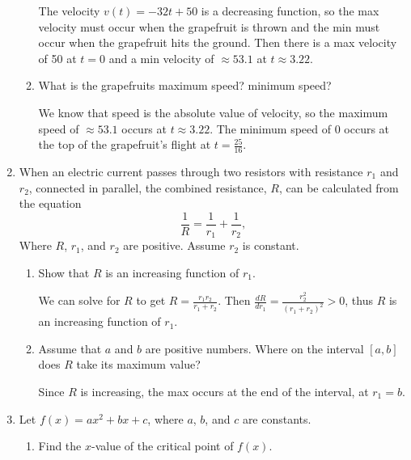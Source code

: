 \documentclass[11pt]{article}
\begin{document}
\begin{enumerate}
\begin{enumerate}
{      The velocity $v(t) = -32t+50$ is a decreasing function, so the
      max velocity must occur when the grapefruit is thrown and the
      min must occur when the grapefruit hits the ground. Then there
      is a max velocity of 50 at $t=0$ and a min velocity of $\approx
      53.1$ at $t\approx 3.22$.

    }
    \vfill
    
  \item What is the grapefruits maximum speed? minimum speed?
    \vfill
    {\color{blue}

      We know that speed is the absolute value of velocity, so the
      maximum speed of $\approx 53.1$ occurs at $t\approx 3.22$.  The
      minimum speed of 0 occurs at the top of the grapefruit's flight
      at $t=\frac{25}{16}$.

    }    
    \vfill
    
  \end{enumerate}

  \newpage
  
\item When an electric current passes through two resistors with
  resistance $r_1$ and $r_2$, connected in parallel, the combined
  resistance, $R$, can be calculated from the equation
  \[
  \frac{1}{R}=\frac{1}{r_1}+\frac{1}{r_2},
  \]
  Where $R$, $r_1$, and $r_2$ are positive.  Assume $r_2$ is constant.
  \begin{enumerate}
  \item Show that $R$ is an increasing function of $r_1$.
    \vfill
    {\color{blue}

      We can solve for $R$ to get $R=\frac{r_1r_2}{r_1+r_2}$.  Then
      $\frac{dR}{dr_1} = \frac{r_2^2}{(r_1+r_2)^2} > 0$, thus $R$ is
      an increasing function of $r_1$.

    }
    \vfill
  \item Assume that $a$ and $b$ are positive numbers.  Where on the interval
    $[a,b]$ does $R$ take its maximum value?
    \vfill
    {\color{blue}

      Since $R$ is increasing, the max occurs at the end of the
      interval, at $r_1 = b$.

    }
    \vfill
  \end{enumerate}

  \newpage

\item Let $f(x)=ax^2+bx+c$, where $a$, $b$, and $c$ are constants.

  \begin{enumerate}
  \item Find the $x$-value of the critical point of $f(x)$.
    \vfill
    {\color{blue}

}
\end{enumerate}
\end{enumerate}
\end{document}
